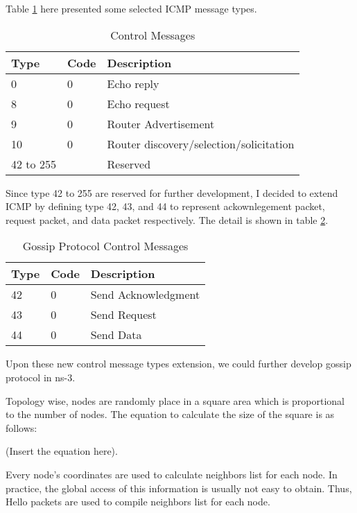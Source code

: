 Table \ref{table:2} here presented some selected ICMP message types. 

\begin{table}[h]
	\centering
	\caption{Control Messages}
	\label{table:2}
	\begin{tabular}{|p{1.5cm}|p{0.8 cm}|p{4.5 cm}|}
		\hline
		Type & Code & Description \\                                                           
		\hline
		0  & 0   & Echo reply   \\ \hline
		8  &  0 & Echo request \\ 
		\hline
		9 & 0 & Router Advertisement \\
		\hline
		10	& 0	&	Router discovery/selection/solicitation \\
		\hline
		42 to 255    &   & Reserved    \\ 
		\hline
	\end{tabular}
\end{table}

Since type 42 to 255 are reserved for further development, I decided to extend ICMP by defining type 42, 43, and 44 to represent ackownlegement packet, request packet, and data packet respectively. The detail is shown in table \ref{table:3}.

\begin{table}[h]
	\centering
	\caption{Gossip Protocol Control Messages}
	\label{table:3}
	\begin{tabular}{|p{0.8cm}|p{0.5 cm}|p{3.5 cm}|}
		\hline
		Type & Code & Description \\                                                           
		\hline
		42  & 0   & Send Acknowledgment   \\ \hline
		43  &  0 & Send Request \\ 
		\hline
		44 & 0 & Send Data \\
		\hline
	\end{tabular}
\end{table}

Upon these new control message types extension, we could further develop gossip protocol in ns-3.



Topology wise, nodes are randomly place in a square area which is proportional to the number of nodes. The equation to calculate the size of the square is as follows:

(Insert the equation here).

Every node's coordinates are used to calculate neighbors list for each node. In practice, the global access of this information is usually not easy to obtain. Thus, Hello packets are used to compile neighbors list for each node.


